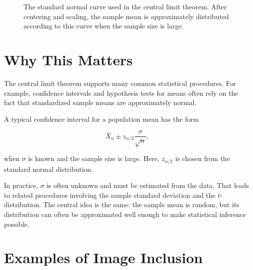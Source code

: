\begin{figure}[htbp]
\centering
{}
\caption{The standard normal curve used in the central limit theorem. After centering and scaling, the sample mean is approximately distributed according to this curve when the sample size is large.}
\label{fig:normal-approximation}
\end{figure}

\section{Why This Matters}
\label{sec:clt-why-it-matters}

The central limit theorem supports many common statistical procedures. For example, confidence intervals and hypothesis tests for means often rely on the fact that standardized sample means are approximately normal.

A typical confidence interval for a population mean has the form

\begin{equation}
\bar{X}_n \pm z_{\alpha/2}\frac{\sigma}{\sqrt{n}},
\label{eq:confidence-interval}
\end{equation}

when \(\sigma\) is known and the sample size is large. Here, \(z_{\alpha/2}\) is chosen from the standard normal distribution.

In practice, \(\sigma\) is often unknown and must be estimated from the data. That leads to related procedures involving the sample standard deviation and the \(t\)-distribution. The central idea is the same: the sample mean is random, but its distribution can often be approximated well enough to make statistical inference possible.

\section{Examples of Image Inclusion}
\label{sec:image-inclusion-examples}


